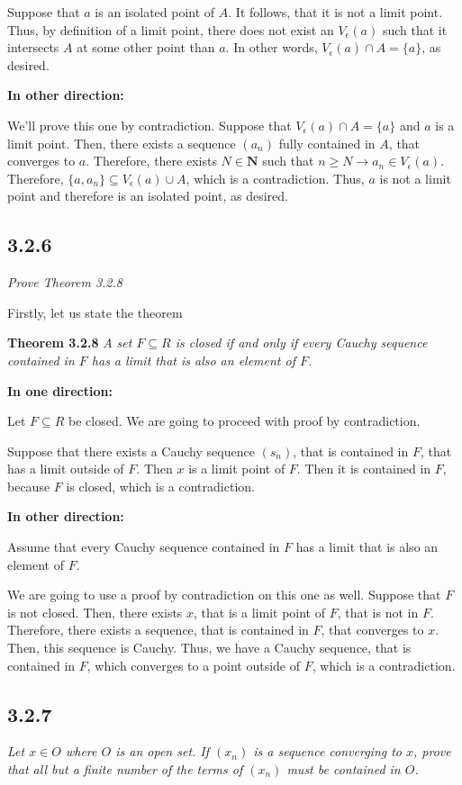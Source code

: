 \documentclass[11pt,oneside,titlepage]{book}
\begin{document}
Suppose that $a$ is an isolated point of $A$. It follows, that it is not a
limit point. Thus, by definition of a limit point, there does not exist an
$V_\epsilon(a)$ such that it intersects $A$ at some other point than $a$.
In other words, $V_\epsilon(a) \cap A = \{a\}$, as desired.

\textbf{In other direction:}

We'll prove this one by contradiction. Suppose that
$V_\epsilon(a) \cap A = \{a\}$ and $a$ is a limit point. Then, there exists
a sequence $(a_n)$ fully contained in $A$, that converges to $a$. Therefore,
there exists $N \in \textbf{N}$ such that $n \geq N \to a_n \in V_\epsilon(a)$.
Therefore, $\{a, a_n\} \subseteq V_\epsilon(a) \cup A$, which is a
contradiction. Thus, $a$ is not a limit point and therefore is an isolated
point, as desired.

\subsection*{3.2.6}

\textit{Prove Theorem 3.2.8}

Firstly, let us state the theorem

\textbf{Theorem 3.2.8}
\textit{A set $F \subseteq R$ is closed if and only if every Cauchy sequence
  contained in $F$ has a limit that is also an element of $F$. }

\textbf{In one direction:}

Let  $F \subseteq R$ be closed. We are going to proceed with proof by
contradiction.

Suppose that there exists a Cauchy sequence $(s_n)$, that is contained in $F$,
that has a limit outside of $F$. Then $x$ is a limit point of $F$. Then it is
contained in $F$, because $F$ is closed, which is a contradiction.

\textbf{In other direction:}

Assume that every Cauchy sequence  contained in $F$ has a limit
that is also an element of $F$.

We are going to use a proof by contradiction on this one as well. Suppose that
$F$ is not closed. Then, there exists $x$, that is a limit point of $F$, that
is not in $F$. Therefore, there exists a sequence, that is contained in $F$,
that converges to $x$. Then, this sequence is Cauchy. Thus, we have a Cauchy
sequence, that is contained in $F$, which converges to a point outside of $F$,
which is a contradiction.

\subsection*{3.2.7}
\textit{Let $x \in O$ where $O$ is an open set. If $(x_n)$ is a sequence
  converging to $x$, prove that all but a finite number of the terms of
  $(x_n)$ must be contained in $O$. }
\end{document}
